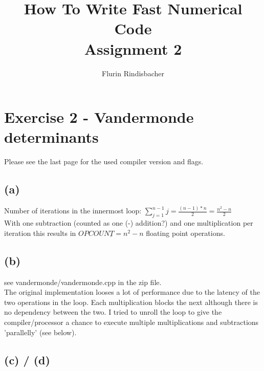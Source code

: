 \documentclass[10pt,a4paper,oneside,notitlepage]{report}
\author{Flurin Rindisbacher}
\title{How To Write Fast Numerical Code \\ \vspace{6 mm} \textbf{Assignment 2}}
\begin{document}
\maketitle

\section*{Exercise 2 - Vandermonde determinants}

Please see the last page for the used compiler version and flags.

\subsection*{(a)}
Number of iterations in the innermost loop: $\sum\limits_{j=1}^{n-1} j = \frac{(n-1)*n}{2} = \frac{n^2 -n}{2}$ \\
With one subtraction (counted as one (-) addition?) and one multiplication per iteration this results in $\underline{OPCOUNT = n^2-n}$ floating point operations.  

\subsection*{(b)}
see vandermonde/vandermonde.cpp in the zip file. \\
The original implementation looses a lot of performance due to the latency of the two operations in the loop. Each multiplication blocks the next although there is no dependency between the two. I tried to unroll the loop to give the compiler/processor a chance to execute multiple multiplications and subtractions 'parallelly' (see below).

\subsection*{(c) / (d)}	
\end{document}
